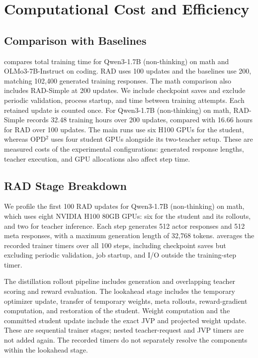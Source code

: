 \documentclass{article} %
\begin{document}
\section{Computational Cost and Efficiency}
\label{app:training-time}

\subsection{Comparison with Baselines}

 compares total training time for
Qwen3-1.7B (non-thinking) on math and OLMo3-7B-Instruct on coding.
RAD uses 100 updates and the baselines use 200, matching 102,400 generated
training responses. The math comparison also includes RAD-Simple at 200 updates.
We include checkpoint
saves and exclude periodic validation, process startup, and time between
training attempts. Each retained update is counted once.
For Qwen3-1.7B (non-thinking) on math, RAD-Simple records 32.48 training
hours over 200 updates, compared with 16.66 hours for RAD over 100 updates.
The main runs use six H100 GPUs for the student, whereas OPD$^2$ uses four
student GPUs alongside its two-teacher setup. These are measured costs of
the experimental configurations: generated response lengths, teacher
execution, and GPU allocations also affect step time.



\subsection{RAD Stage Breakdown}

We profile the first 100 RAD updates for Qwen3-1.7B (non-thinking) on math, which uses eight NVIDIA H100 80GB GPUs: six for the student and its rollouts,
and two for teacher inference. Each step generates 512 actor responses and
512 meta responses, with a maximum generation length of 32,768 tokens.
 averages the recorded trainer timers over
all 100 steps, including checkpoint saves but excluding periodic validation,
job startup, and I/O outside the training-step timer.



The distillation rollout pipeline includes generation and overlapping teacher
scoring and reward evaluation. The lookahead stage includes the temporary
optimizer update, transfer of temporary weights, meta rollouts, reward-gradient
computation, and restoration of the student. Weight computation and the
committed student update include the exact JVP and projected weight update.
These are sequential trainer stages; nested teacher-request and JVP timers
are not added again. The recorded timers do not separately resolve the
components within the lookahead stage.
\end{document}

